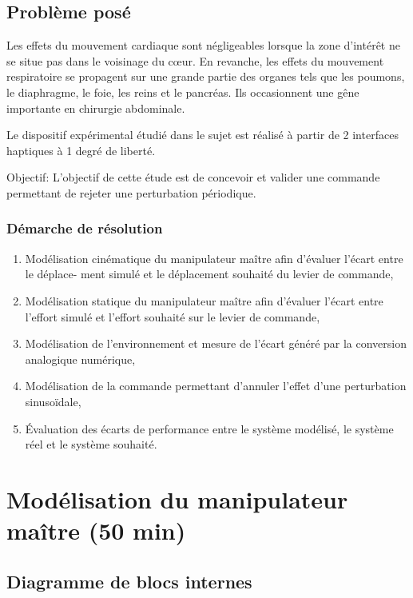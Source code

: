 \subsection{Problème posé}

Les effets du mouvement cardiaque sont négligeables lorsque la zone d'intérêt ne se situe pas dans le voisinage du c\oe ur. En revanche, les effets du mouvement respiratoire se propagent sur une grande partie des organes tels que les poumons, le diaphragme, le foie, les reins et le pancréas. Ils occasionnent une gêne importante en chirurgie abdominale.

Le dispositif expérimental étudié dans le sujet est réalisé à partir de 2 interfaces haptiques à 1 degré de liberté.

Objectif: L'objectif de cette étude est de concevoir et valider une commande permettant de rejeter une perturbation périodique.

\subsubsection{Démarche de résolution}

\begin{enumerate}
 \item Modélisation cinématique du manipulateur maître afin d'évaluer l'écart entre le déplace- ment simulé et le déplacement souhaité du levier de commande,
 \item Modélisation statique du manipulateur maître afin d'évaluer l'écart entre l'effort simulé et l'effort souhaité sur le levier de commande,
 \item Modélisation de l'environnement et mesure de l'écart généré par la conversion analogique numérique,
 \item Modélisation de la commande permettant d'annuler l'effet d'une perturbation sinusoïdale,
 \item Évaluation des écarts de performance entre le système modélisé, le système réel et  le
système souhaité.
\end{enumerate}

\section{Modélisation  du  manipulateur maître (50 min)}

\subsection{Diagramme de blocs internes}

